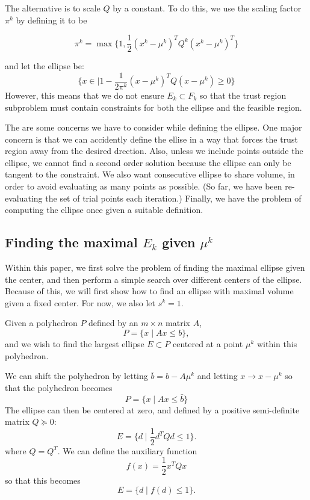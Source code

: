 \documentclass{article}
\begin{document}
The alternative is to scale $Q$ by a constant.
To do this, we use the scaling factor $\pi^k$ by defining it to be

$$\pi^k = \max \{1, \frac 1 {2} (x^{k} - \mu^{k})^T Q^k (x^{k} - \mu^{k})^T \}$$

and let the ellipse be:
$$\{x \in \mathbb | 1 - \frac 1 {2\pi^k} (x - \mu^{k})^T Q (x - \mu^{k}) \ge 0\} $$
However, this means that we do not ensure $E_k \subset F_k$ so that the trust region subproblem must contain constraints for both the ellipse and the feasible region.


The are some concerns we have to consider while defining the ellipse.
One major concern is that we can accidently define the ellise in a way that forces the trust region away from the desired drection.
Also, unless we include points outside the ellipse, we cannot find a second order solution because the ellipse can only be tangent to the constraint.
We also want consecutive ellipse to share volume, in order to avoid evaluating as many points as possible.
(So far, we have been re-evaluating the set of trial points each iteration.)
Finally, we have the problem of computing the ellipse once given a suitable definition.


\subsection{Finding the maximal $E_k$ given $\mu^k$}

\label{ellipse_optimization}

Within this paper, we first solve the problem of finding the maximal ellipse given the center, and then perform a simple search over different centers of the ellipse.
Because of this, we will first show how to find an ellipse with maximal volume given a fixed center.
For now, we also let $s^k = 1$.

Given a polyhedron $P$ defined by an $m \times n$ matrix $A$,
\[
P = \{ x \; | \;  Ax \le b \},
\]
and we wish to find the largest ellipse $E \subset P$ centered at a point $\mu^{k}$ within this polyhedron.

We can shift the polyhedron by letting $\bar{b} = b - A\mu^{k}$ and letting $x \to x - \mu^{k}$ so that the polyhedron becomes
\[
P = \{ x \; | \;  Ax \le \bar{b} \}
\]
The ellipse can then be centered at zero, and defined by a positive semi-definite matrix $Q \succeq 0$:
\[
E = \{ d \; | \; \frac 1 2 d^T Q d \le 1 \}.
\]
where $Q = Q^T$.
We can define the auxiliary function 
\[
f(x) = \frac 1 2 x^T Q x
\]
so that this becomes
\[
E = \{ d \; | \; f(d) \le 1 \}.
\]
\end{document}
